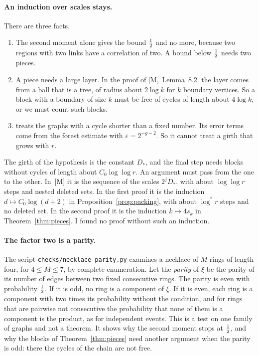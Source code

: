 \documentclass[11pt]{article}
\newcommand{\M}[1]{[M,~#1]}
\begin{document}
\paragraph{An induction over scales stays.} There are three facts.
\begin{enumerate}[leftmargin=1.6em]
\item The second moment alone gives the bound $\tfrac12$ and no more, because two regions with two
links have a correlation of two. A bound below $\tfrac12$ needs two pieces.
\item A piece needs a large layer. In the proof of \M{Lemma~8.2} the layer comes from a ball
that is a tree, of radius about $2\log k$ for $k$ boundary vertices. So a block with a boundary
of size $k$ must be free of cycles of length about $4\log k$, or we must count such blocks.
\item \M{Theorem~7.1} treats the graphs with a cycle shorter than a fixed number. Its error terms
come from the forest estimate with $\varepsilon=2^{-g-2}$. So it cannot treat a girth that grows
with $r$.
\end{enumerate}
The girth of the hypothesis is the constant $D_*$, and the final step needs blocks without cycles
of length about $C_0\log\log r$. An argument must pass from the one to the other. In~[M] it is the
sequence of the scales $2^{j}D_*$, with about $\log\log r$ steps and nested deleted sets. In the
first proof it is the induction $d\mapsto C_0\log(d+2)$ in Proposition~\ref{prop:packing}, with
about $\log^{*}r$ steps and no deleted set. In the second proof it is the induction
$k\mapsto4s_k$ in Theorem~\ref{thm:pieces}. I found no proof without such an induction.

\paragraph{The factor two is a parity.} The script \texttt{checks/necklace\_parity.py} examines
a necklace of $M$ rings of length four, for $4\le M\le7$, by complete enumeration. Let the
\emph{parity} of $\xi$ be the parity of its number of edges between two fixed consecutive rings.
The parity is even with probability $\tfrac12$. If it is odd, no ring is a component of $\xi$. If it
is even, each ring is a component with two times its probability without the condition, and for
rings that are pairwise not consecutive the probability that none of them is a component is the
product, as for independent events. This is a test on one family of graphs and not a theorem. It shows why the second moment stops at $\tfrac12$, and why the blocks of
Theorem~\ref{thm:pieces} need another argument when the parity is odd: there the cycles of the
chain are not free.
\end{document}
